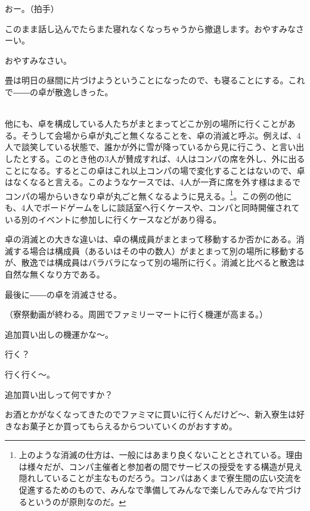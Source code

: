 \begin{multicols}{2}
おー。（拍手）

このまま話し込んでたらまた寝れなくなっちゃうから撤退します。おやすみなさーい。

おやすみなさい。

畳は明日の昼間に片づけようということになったので、も寝ることにする。これで――の卓が散逸しきった。
\par
\dotfill

\\
他にも、卓を構成している人たちがまとまってどこか別の場所に行くことがある。そうして会場から卓が丸ごと無くなることを、卓の消滅と呼ぶ。例えば、4人で談笑している状態で、誰かが外に雪が降っているから見に行こう、と言い出したとする。このとき他の3人が賛成すれば、4人はコンパの席を外し、外に出ることになる。するとこの卓はこれ以上コンパの場で変化することはないので、卓はなくなると言える。このようなケースでは、4人が一斉に席を外す様はまるでコンパの場からいきなり卓が丸ごと無くなるように見える。\footnote{上のような消滅の仕方は、一般にはあまり良くないこととされている。理由は様々だが、コンパ主催者と参加者の間でサービスの授受をする構造が見え隠れしていることが主なものだろう。コンパはあくまで寮生間の広い交流を促進するためのもので、みんなで準備してみんなで楽しんでみんなで片づけるというのが原則なのだ。}。この例の他にも、4人でボードゲームをしに談話室へ行くケースや、コンパと同時開催されている別のイベントに参加しに行くケースなどがあり得る。
\par
卓の消滅との大きな違いは、卓の構成員がまとまって移動するか否かにある。消滅する場合は構成員（あるいはその中の数人）がまとまって別の場所に移動するが、散逸では構成員はバラバラになって別の場所に行く。消滅と比べると散逸は自然な無くなり方である。
\par
\dotfill
\par
最後に――の卓を消滅させる。
\par
（寮祭動画が終わる。周囲でファミリーマートに行く機運が高まる。）
\par
{}
追加買い出しの機運かな～。

行く？

行く行く～。

追加買い出しって何ですか？

お酒とかがなくなってきたのでファミマに買いに行くんだけど～、新入寮生は好きなお菓子とか買ってもらえるからついていくのがおすすめ。


\end{multicols}
